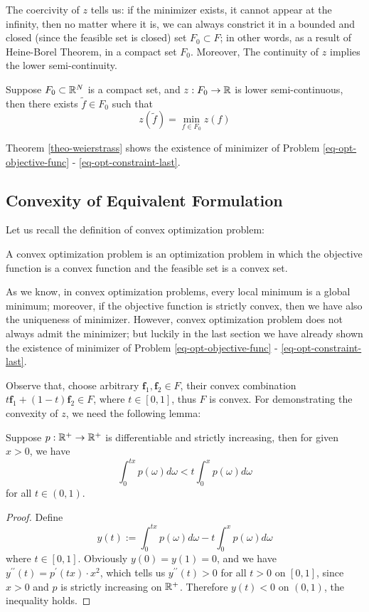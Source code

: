 \documentclass{article}
\begin{document}
The coercivity of $ z $ tells us: if the minimizer exists, it cannot appear at the infinity, then no matter where it is, we can always constrict it in a bounded and closed (since the feasible set is closed) set $ F_0 \subset F $; in other words, as a result of Heine-Borel Theorem, in a compact set $ F_0 $. Moreover, The continuity of $ z $ implies the lower semi-continuity. 

\begin{theo} [Weierstrass] \label{theo-weierstrass}
    Suppose $ F_0 \subset \mathbb{R}^N $ is a compact set, and $ z : F_0 \rightarrow \mathbb{R} $ is lower semi-continuous, then there exists $ \tilde{f} \in F_0 $ such that 
    $$ z(\tilde{f}) = \min_{f \in F_0} z(f) $$
\end{theo}

Theorem \ref{theo-weierstrass} shows the existence of minimizer of Problem \ref{eq-opt-objective-func} - \ref{eq-opt-constraint-last}.

\subsection{Convexity of Equivalent Formulation}

Let us recall the definition of convex optimization problem:

\begin{defi} \label{def-convex-prob}
    A convex optimization problem is an optimization problem in which the objective function is a convex function and the feasible set is a convex set.
\end{defi}

As we know, in convex optimization problems, every local minimum is a global minimum; moreover, if the objective function is strictly convex, then we have also the uniqueness of minimizer. However, convex optimization problem does not always admit the minimizer; but luckily in the last section we have already shown the existence of minimizer of Problem \ref{eq-opt-objective-func} - \ref{eq-opt-constraint-last}.

Observe that, choose arbitrary $ \boldsymbol{f}_1, \boldsymbol{f}_2 \in F $, their convex combination $ t \boldsymbol{f}_1 + (1-t) \boldsymbol{f}_2 \in F $, where $ t \in [0, 1] $, thus $ F $ is convex. For demonstrating the convexity of $ z $, we need the following lemma:

\begin{lemm} \label{lemm-ineq-int}
    Suppose $ p : \mathbb{R}^+ \rightarrow \mathbb{R}^+ $ is differentiable and strictly increasing, then for given $ x > 0 $, we have
    $$ \int_0^{tx} p (\omega) d \omega < t \int_0^x p (\omega) d \omega $$
    for all $ t \in (0, 1) $.
\end{lemm}
\begin{proof}
    Define 
    $$ y (t) := \int_0^{tx} p (\omega) d \omega - t \int_0^x p (\omega) d \omega $$
    where $ t \in [0, 1] $. Obviously $ y (0) = y (1) = 0 $, and we have $ y^{\prime\prime}(t) = p^\prime(tx) \cdot x^2 $, which tells us $ y^{\prime\prime}(t) > 0 $ for all $ t > 0 $ on $ [0, 1] $, since $ x > 0 $ and $ p $ is strictly increasing on $ \mathbb{R}^+ $. Therefore $ y(t) < 0 $ on $ (0, 1) $, the inequality holds.
\end{proof}
\end{document}
